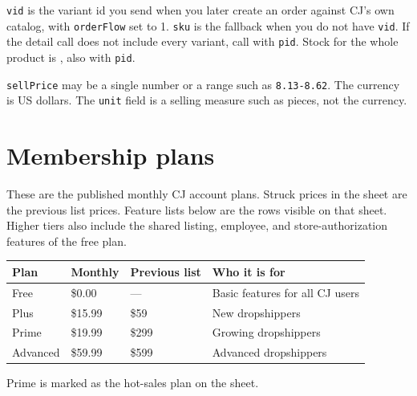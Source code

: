\documentclass[11pt]{article}
\begin{document}
\texttt{vid} is the variant id you send when you later create an order against CJ's own catalog, with \texttt{orderFlow} set to 1. \texttt{sku} is the fallback when you do not have \texttt{vid}. If the detail call does not include every variant, call  with \texttt{pid}. Stock for the whole product is , also with \texttt{pid}.

\texttt{sellPrice} may be a single number or a range such as \texttt{8.13-8.62}. The currency is US dollars. The \texttt{unit} field is a selling measure such as pieces, not the currency.

\section{Membership plans}

These are the published monthly CJ account plans. Struck prices in the sheet are the previous list prices. Feature lists below are the rows visible on that sheet. Higher tiers also include the shared listing, employee, and store-authorization features of the free plan.

\begin{center}
\begin{tabular}{@{}llll@{}}
\toprule
Plan & Monthly & Previous list & Who it is for \\
\midrule
Free & \$0.00 & --- & Basic features for all CJ users \\
Plus & \$15.99 & \$59 & New dropshippers \\
Prime & \$19.99 & \$299 & Growing dropshippers \\
Advanced & \$59.99 & \$599 & Advanced dropshippers \\
\bottomrule
\end{tabular}
\end{center}

Prime is marked as the hot-sales plan on the sheet.
\end{document}

